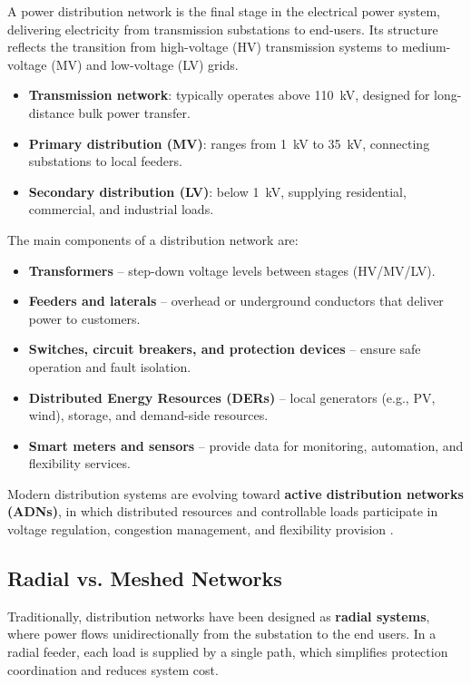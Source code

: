 \documentclass[11pt]{article}
\begin{document}
	A power distribution network is the final stage in the electrical power system, delivering electricity from transmission substations to end-users.  
	Its structure reflects the transition from high-voltage (HV) transmission systems to medium-voltage (MV) and low-voltage (LV) grids.
	
	\begin{itemize}
		\item \textbf{Transmission network}: typically operates above 110~kV, designed for long-distance bulk power transfer.
		\item \textbf{Primary distribution (MV)}: ranges from 1~kV to 35~kV, connecting substations to local feeders.
		\item \textbf{Secondary distribution (LV)}: below 1~kV, supplying residential, commercial, and industrial loads.
	\end{itemize}
	
	The main components of a distribution network are:
	\begin{itemize}
		\item \textbf{Transformers} – step-down voltage levels between stages (HV/MV/LV).
		\item \textbf{Feeders and laterals} – overhead or underground conductors that deliver power to customers.
		\item \textbf{Switches, circuit breakers, and protection devices} – ensure safe operation and fault isolation.
		\item \textbf{Distributed Energy Resources (DERs)} – local generators (e.g., PV, wind), storage, and demand-side resources.
		\item \textbf{Smart meters and sensors} – provide data for monitoring, automation, and flexibility services.
	\end{itemize}
	
	Modern distribution systems are evolving toward \textbf{active distribution networks (ADNs)}, in which distributed resources and controllable loads participate in voltage regulation, congestion management, and flexibility provision \cite{ENTSOE_flexibility2023,CIRED_ADN2019}.
	
	\subsection{Radial vs. Meshed Networks}
	
	Traditionally, distribution networks have been designed as \textbf{radial systems}, where power flows unidirectionally from the substation to the end users.  
	In a radial feeder, each load is supplied by a single path, which simplifies protection coordination and reduces system cost.
	
\end{document}
